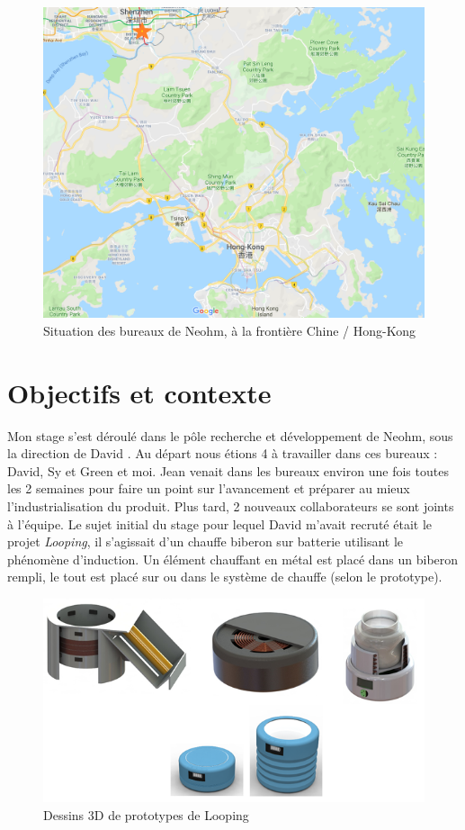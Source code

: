 \documentclass[a4paper, 12pt, sffamily]{report}
\begin{document}
\begin{figure}
\centering
\includegraphics[scale=0.4]{figures/screenshots/screen_maps.png}
\caption{Situation des bureaux de Neohm, à la frontière Chine / Hong-Kong}
\label{fig:screen_maps}
\end{figure}

\chapter{Objectifs et contexte}
Mon stage s’est déroulé dans le pôle recherche et développement de Neohm, sous la direction de David . Au départ nous étions 4 à travailler dans ces bureaux : David, Sy et Green et moi. Jean venait dans les bureaux environ une fois toutes les 2 semaines pour faire un point sur l'avancement et préparer au mieux l'industrialisation du produit. Plus tard, 2 nouveaux collaborateurs se sont joints à l’équipe.
Le sujet initial du stage pour lequel David m’avait recruté était le projet \emph{Looping}, il s’agissait d’un chauffe biberon sur batterie utilisant le phénomène d’induction. Un élément chauffant en métal est placé dans un biberon rempli, le tout est placé sur ou dans le système de chauffe (selon le prototype).

\begin{figure}[H]
\centering
\includegraphics[scale=0.75]{figures/screenshots/3D_drawing_looping.png}
\caption{Dessins 3D de prototypes de Looping}
\label{fig:3D_looping}
\end{figure}
\end{document}
